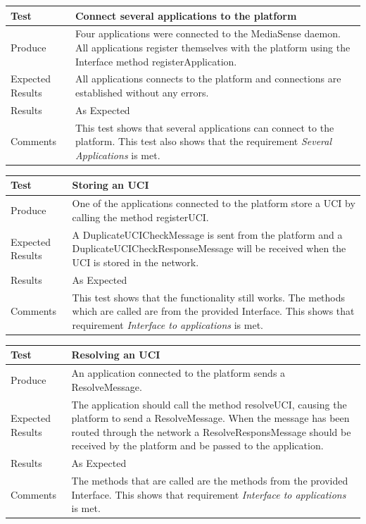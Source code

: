 \begin{center}
    \begin{tabular}{ | l | p{12cm} |}
    \hline
    Test 	 				& 		 Connect several applications to the platform\\ \hline
	Produce  				& 		 Four applications were connected to the MediaSense daemon. All applications register themselves with the platform using the Interface method registerApplication.\\ \hline
	Expected Results  		& 		 All applications connects to the platform and connections are established without any errors.\\ \hline
	Results 				& 		 As Expected\\ \hline
	Comments				& 		 This test shows that several applications can connect to the platform. This test also shows that the requirement \emph{Several Applications} is met.\\ \hline
    \end{tabular}
\end{center}

\begin{center}
    \begin{tabular}{ | l | p{12cm} |}
    \hline
    Test 	 				& 		 Storing an UCI\\ \hline
	Produce  				& 		 One of the applications connected to the platform store a UCI by calling the method registerUCI.\\ \hline
	Expected Results  		& 		 A DuplicateUCICheckMessage is sent from the platform and a DuplicateUCICheckResponseMessage will be received when the UCI is stored in the network.\\ \hline
	Results 				& 		 As Expected\\ \hline
	Comments				& 		 This test shows that the functionality still works. The methods which are called are from the provided Interface. This shows that requirement \emph{Interface to applications} is met.\\ \hline
    \end{tabular}
\end{center}

\begin{center}
    \begin{tabular}{ | l | p{12cm} |}
    \hline
    Test 	 				& 		 Resolving an UCI\\ \hline
	Produce  				& 		 An application connected to the platform sends a ResolveMessage.\\ \hline
	Expected Results  		& 		 The application should call the method resolveUCI, causing the platform to send a ResolveMessage. When the message has been routed through the network a ResolveResponsMessage should be received by the platform and be passed to the application. \\ \hline
	Results 				& 		 As Expected\\ \hline
	Comments				& 		 The methods that are called are the methods from the provided Interface. This shows that requirement \emph{Interface to applications} is met.\\ \hline
    \end{tabular}
\end{center}

